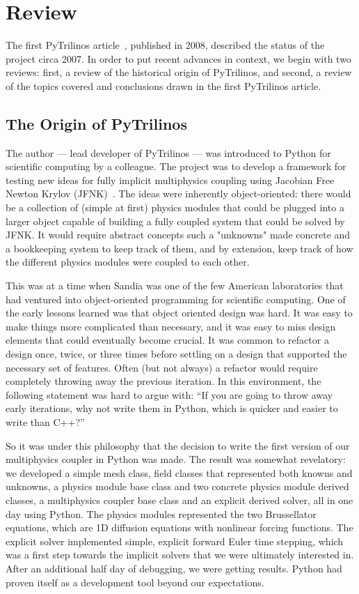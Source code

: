 \documentclass[11pt]{article}
\begin{document}
\section{Review}
\label{sec:review}

The first PyTrilinos article~\cite{PyTrilinos}, published in 2008, described the status of the project circa 2007.  In order to put recent advances in context, we begin with two reviews: first, a review of the historical origin of PyTrilinos, and second, a review of the topics covered and conclusions drawn in the first PyTrilinos article.

\subsection{The Origin of PyTrilinos}
\label{sec:origin}

The author --- lead developer of PyTrilinos --- was introduced to Python for scientific computing by a colleague.  The project was to develop a framework for testing new ideas for fully implicit multiphysics coupling using Jacobian Free Newton Krylov (JFNK)~\cite{JFNK}.  The ideas were inherently object-oriented: there would be a collection of (simple at first) physics modules that could be plugged into a larger object capable of building a fully coupled system that could be solved by JFNK.  It would require abstract concepts such a "unknowns" made concrete and a bookkeeping system to keep track of them, and by extension, keep track of how the different physics modules were coupled to each other.

This was at a time when Sandia was one of the few American laboratories that had ventured into object-oriented programming for scientific computing.  One of the early lessons learned was that object oriented design was hard.  It was easy to make things more complicated than necessary, and it was easy to miss design elements that could eventually become crucial.  It was common to refactor a design once, twice, or three times before settling on a design that supported the necessary set of features.  Often (but not always) a refactor would require completely throwing away the previous iteration.  In this environment, the following statement was hard to argue with: ``If you are going to throw away early iterations, why not write them in Python, which is quicker and easier to write than C++?''

So it was under this philosophy that the decision to write the first version of our multiphysics coupler in Python was made.  The result was somewhat revelatory: we developed a simple mesh class, field classes that represented both knowns and unknowns, a physics module base class and two concrete physics module derived classes, a multiphysics coupler base class and an explicit derived solver, all in one day using Python.  The physics modules represented the two Brussellator equations, which are 1D diffusion equations with nonlinear forcing functions.  The explicit solver implemented simple, explicit forward Euler time stepping, which was a first step towards the implicit solvers that we were ultimately interested in.  After an additional half day of debugging, we were getting results.  Python had proven itself as a development tool beyond our expectations.
\end{document}
